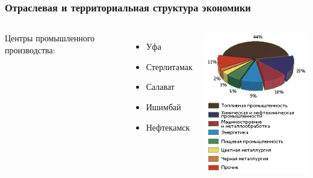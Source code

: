 \begin{frame}
\frametitle{Отраслевая и территориальная структура экономики}
\begin{columns}
Центры промышленного производства: 
\begin{itemize}
\item Уфа 
\item Стерлитамак 
\item Салават 
\item Ишимбай 
\item Нефтекамск 
\end{itemize}

\includegraphics[width=1\linewidth]{pics/sasha/promstruct}
\end{columns}
\end{frame}

